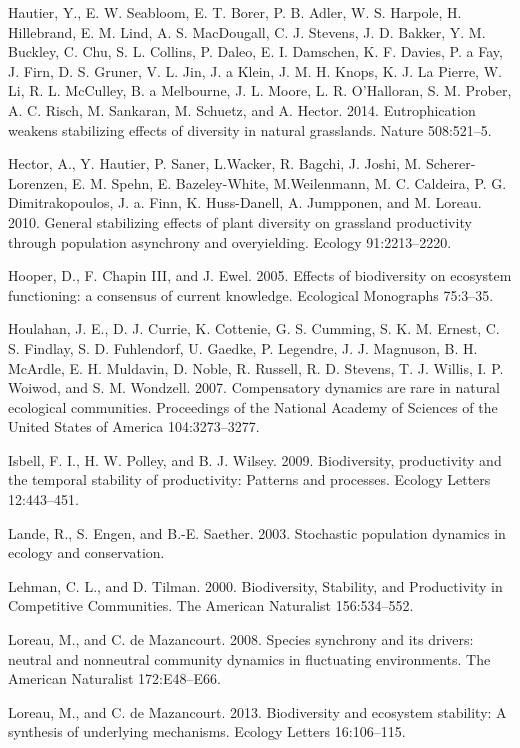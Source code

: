 \documentclass[12pt,]{article}
\begin{document}
Hautier, Y., E. W. Seabloom, E. T. Borer, P. B. Adler, W. S. Harpole, H.
Hillebrand, E. M. Lind, A. S. MacDougall, C. J. Stevens, J. D. Bakker,
Y. M. Buckley, C. Chu, S. L. Collins, P. Daleo, E. I. Damschen, K. F.
Davies, P. a Fay, J. Firn, D. S. Gruner, V. L. Jin, J. a Klein, J. M. H.
Knops, K. J. {La Pierre}, W. Li, R. L. McCulley, B. a Melbourne, J. L.
Moore, L. R. O'Halloran, S. M. Prober, A. C. Risch, M. Sankaran, M.
Schuetz, and A. Hector. 2014. Eutrophication weakens stabilizing effects
of diversity in natural grasslands. Nature 508:521--5.

Hector, A., Y. Hautier, P. Saner, L.Wacker, R. Bagchi, J. Joshi, M.
Scherer-Lorenzen, E. M. Spehn, E. Bazeley-White, M.Weilenmann, M. C.
Caldeira, P. G. Dimitrakopoulos, J. a. Finn, K. Huss-Danell, A.
Jumpponen, and M. Loreau. 2010. General stabilizing effects of plant
diversity on grassland productivity through population asynchrony and
overyielding. Ecology 91:2213--2220.

Hooper, D., F. {Chapin III}, and J. Ewel. 2005. Effects of biodiversity
on ecosystem functioning: a consensus of current knowledge. Ecological
Monographs 75:3--35.

Houlahan, J. E., D. J. Currie, K. Cottenie, G. S. Cumming, S. K. M.
Ernest, C. S. Findlay, S. D. Fuhlendorf, U. Gaedke, P. Legendre, J. J.
Magnuson, B. H. McArdle, E. H. Muldavin, D. Noble, R. Russell, R. D.
Stevens, T. J. Willis, I. P. Woiwod, and S. M. Wondzell. 2007.
Compensatory dynamics are rare in natural ecological communities.
Proceedings of the National Academy of Sciences of the United States of
America 104:3273--3277.

Isbell, F. I., H. W. Polley, and B. J. Wilsey. 2009. Biodiversity,
productivity and the temporal stability of productivity: Patterns and
processes. Ecology Letters 12:443--451.

Lande, R., S. Engen, and B.-E. Saether. 2003. Stochastic population
dynamics in ecology and conservation.

Lehman, C. L., and D. Tilman. 2000. Biodiversity, Stability, and
Productivity in Competitive Communities. The American Naturalist
156:534--552.

Loreau, M., and C. {{de Mazancourt}}. 2008. Species synchrony and its
drivers: neutral and nonneutral community dynamics in fluctuating
environments. The American Naturalist 172:E48--E66.

Loreau, M., and C. {{de Mazancourt}}. 2013. Biodiversity and ecosystem
stability: A synthesis of underlying mechanisms. Ecology Letters
16:106--115.
\end{document}
